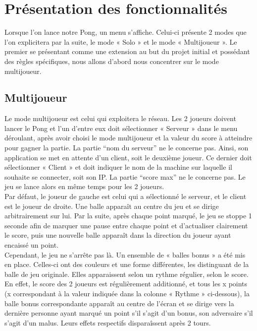 \chapter{Présentation des fonctionnalités}
Lorsque l'on lance notre Pong, un menu s'affiche. Celui-ci présente 2 modes que l'on explicitera par la
suite, le mode « Solo » et le mode « Multijoueur ». Le premier se présentant comme une extension au but 
du projet initial et possédant des règles spécifiques, nous allons d'abord nous concentrer sur le mode multijoueur.


\section{Multijoueur}

Le mode multijoueur est celui qui exploitera le réseau. Les 2 joueurs doivent lancer le Pong et l'un d'entre eux 
doit sélectionner « Serveur » dans le menu déroulant, après avoir choisi le mode multijoueur et la valeur du score à atteindre 
pour gagner la partie. La partie ``nom du serveur'' ne le concerne pas. Ainsi, son 
application se met en attente d'un client, soit le deuxième joueur. Ce dernier doit sélectionner « Client » 
et doit indiquer le nom de la machine sur laquelle il souhaite se connecter, soit son IP. La partie ``score max''
ne le concerne pas. Le jeu se 
lance alors en même temps pour les 2 joueurs.
\\
Par défaut, le joueur de gauche est celui qui a sélectionné le serveur, et le client est le joueur de 
droite. Une balle apparaît au centre du jeu et se dirige arbitrairement sur lui. Par la suite, après chaque point 
marqué, le jeu se stoppe 1 seconde afin de marquer une pause entre chaque point et d'actualiser clairement 
le score, puis une nouvelle balle apparaît dans la direction du joueur ayant encaissé un point.
\\
Cependant, le jeu ne s'arrête pas là. Un ensemble de « balles bonus » a été mis en place. Celles-ci 
ont des couleurs et une forme différentes, les distinguant de la balle de jeu originale. Elles apparaissent 
selon un rythme régulier, selon le score. En effet, le score des 2 joueurs est régulièrement additionné, et 
tous les x points (x correspondant à la valeur indiquée dans la colonne « Rythme » ci-dessous), la balle 
bonus correspondante apparaît au centre de l'écran et se dirige vers la dernière personne ayant marqué un 
point s'il s'agit d'un bonus, son adversaire s'il s'agit d'un malus. 
Leurs effets respectifs disparaîssent après 2 tours.

